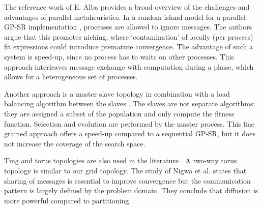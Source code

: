 
The reference work of E. Alba \cite{parallelmetaheuristics} provides a broad overview of the challenges and advantages of parallel metaheuristics. 
In a random island model for a parallel GP-SR implementation \citep{DGPSR}, processes are allowed to ignore messages. The authors argue that this promotes niching, where `contamination' of locally (per process) fit expressions could introduce premature convergence. The advantage of such a system is speed-up, since no process has to waits on other processes. %
This approach interleaves message exchange with computation during a phase, which allows for a heterogeneous set of processes. 

Another approach is a master slave topology in combination with a load balancing algorithm between the slaves \citep{DFGPSR}. The slaves are not separate algorithms: they are assigned a subset of the population and only compute the fitness function. Selection and evolution are performed by the master process. This fine grained approach offers a speed-up compared to a sequential GP-SR, but it does not increase the coverage of the search space. 

Ting and torus topologies are also used in the literature \cite{DGP}. A two-way torus topology is similar to our grid topology. The study of Nigwa et al. \cite{DGP} states that sharing of messages is essential to improve convergence but the communication pattern is largely defined by the problem domain. They conclude that diffusion is more powerful compared to partitioning.